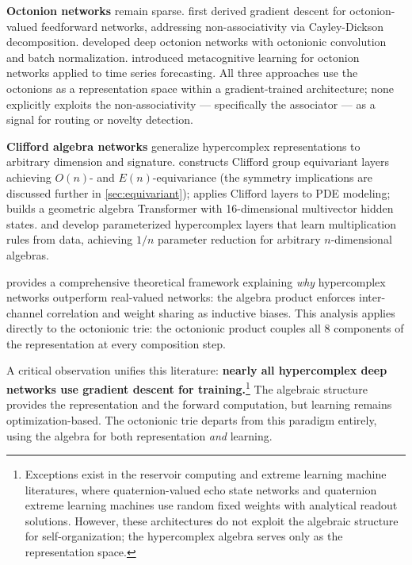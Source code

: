 \documentclass[11pt,a4paper]{article}
\theoremstyle{definition}
\theoremstyle{remark}
\begin{document}
\textbf{Octonion networks} remain sparse. \citet{Popa2016} first derived gradient descent for octonion-valued feedforward networks, addressing non-associativity via Cayley-Dickson decomposition. \citet{Wu2020} developed deep octonion networks with octonionic convolution and batch normalization. \citet{Saoud2020} introduced metacognitive learning for octonion networks applied to time series forecasting. All three approaches use the octonions as a representation space within a gradient-trained architecture; none explicitly exploits the non-associativity --- specifically the associator --- as a signal for routing or novelty detection.

\textbf{Clifford algebra networks} generalize hypercomplex representations to arbitrary dimension and signature. \citet{Ruhe2023} constructs Clifford group equivariant layers achieving $O(n)$- and $E(n)$-equivariance (the symmetry implications are discussed further in \cref{sec:equivariant}); \citet{Brandstetter2023} applies Clifford layers to PDE modeling; \citet{Brehmer2023} builds a geometric algebra Transformer with 16-dimensional multivector hidden states. \citet{Zhang2021} and \citet{Grassucci2022} develop parameterized hypercomplex layers that learn multiplication rules from data, achieving $1/n$ parameter reduction for arbitrary $n$-dimensional algebras.

\citet{Comminiello2024} provides a comprehensive theoretical framework explaining \emph{why} hypercomplex networks outperform real-valued networks: the algebra product enforces inter-channel correlation and weight sharing as inductive biases. This analysis applies directly to the octonionic trie: the octonionic product couples all 8 components of the representation at every composition step.

A critical observation unifies this literature: \textbf{nearly all hypercomplex deep networks use gradient descent for training.}\footnote{Exceptions exist in the reservoir computing and extreme learning machine literatures, where quaternion-valued echo state networks and quaternion extreme learning machines use random fixed weights with analytical readout solutions. However, these architectures do not exploit the algebraic structure for self-organization; the hypercomplex algebra serves only as the representation space.} The algebraic structure provides the representation and the forward computation, but learning remains optimization-based. The octonionic trie departs from this paradigm entirely, using the algebra for both representation \emph{and} learning.
\end{document}
